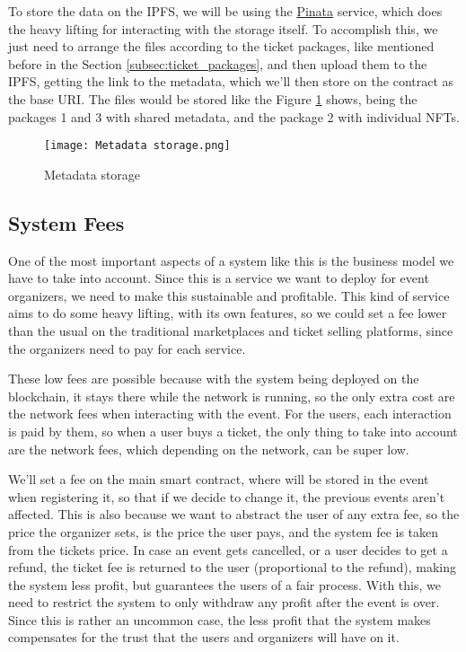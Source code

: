 To store the data on the IPFS, we will be using the \href{https://www.pinata.cloud/}{Pinata} service, which does the heavy lifting for interacting with the storage itself. To accomplish this, we just need to arrange the files according to the ticket packages, like mentioned before in the Section \ref{subsec:ticket_packages}, and then upload them to the IPFS, getting the link to the metadata, which we'll then store on the contract as the base URI. The files would be stored like the Figure \ref{fig:metadata_storage} shows, being the packages 1 and 3 with shared metadata, and the package 2 with individual NFTs.

\begin{figure}[H]
    \texttt{[image: Metadata storage.png]}
    \centering
    \caption{Metadata storage}
    \label{fig:metadata_storage}
\end{figure}

\subsection{System Fees}
\label{subsec:system_fees}

One of the most important aspects of a system like this is the business model we have to take into account. Since this is a service we want to deploy for event organizers, we need to make this sustainable and profitable. This kind of service aims to do some heavy lifting, with its own features, so we could set a fee lower than the usual on the traditional marketplaces and ticket selling platforms, since the organizers need to pay for each service.

These low fees are possible because with the system being deployed on the blockchain, it stays there while the network is running, so the only extra cost are the network fees when interacting with the event. For the users, each interaction is paid by them, so when a user buys a ticket, the only thing to take into account are the network fees, which depending on the network, can be super low.

We'll set a fee on the main smart contract, where will be stored in the event when registering it, so that if we decide to change it, the previous events aren't affected. This is also because we want to abstract the user of any extra fee, so the price the organizer sets, is the price the user pays, and the system fee is taken from the tickets price. In case an event gets cancelled, or a user decides to get a refund, the ticket fee is returned to the user (proportional to the refund), making the system less profit, but guarantees the users of a fair process. With this, we need to restrict the system to only withdraw any profit after the event is over. Since this is rather an uncommon case, the less profit that the system makes compensates for the trust that the users and organizers will have on it.

